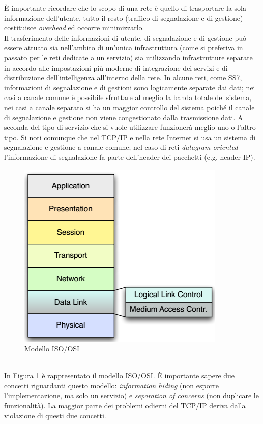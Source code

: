 È importante ricordare che lo scopo di una rete è quello di trasportare la sola informazione dell'utente, tutto il resto (traffico di segnalazione e di gestione) costituisce \textit{overhead} ed occorre minimizzarlo.\\
Il trasferimento delle informazioni di utente, di segnalazione e di gestione può essere attuato sia nell'ambito di un'unica infrastruttura (come si preferiva in passato per le reti dedicate a un servizio) sia utilizzando infrastrutture separate in accordo alle impostazioni più moderne di integrazione dei servizi e di distribuzione dell'intelligenza all'interno della rete. In alcune reti, come SS7, informazioni di segnalazione e di gestioni sono logicamente separate dai dati; nei casi a canale comune è possibile sfruttare al meglio la banda totale del sistema, nei casi a canale separato si ha un maggior controllo del sistema poiché il canale di segnalazione e gestione non viene congestionato dalla trasmissione dati. A seconda del tipo di servizio che si vuole utilizzare funzionerà meglio uno o l'altro tipo. Si noti comunque che nel TCP/IP e nella rete Internet si usa un sistema di segnalazione e gestione a canale comune; nel caso di reti \textit{datagram oriented} l'informazione di segnalazione fa parte dell'header dei pacchetti (e.g. header IP).
\begin{figure}[htbp]
	\centering
	\includegraphics[scale = 0.55]{images/ISO-OSI}
	\caption{Modello ISO/OSI}
	\label{img:ISO-OSI}
\end{figure}\\
In Figura \ref{img:ISO-OSI} è rappresentato il modello ISO/OSI. È importante sapere due concetti riguardanti questo modello: \textit{information hiding} (non esporre l'implementazione, ma solo un servizio) e \textit{separation of concerns} (non duplicare le funzionalità). La maggior parte dei problemi odierni del TCP/IP deriva dalla violazione di questi due concetti.
